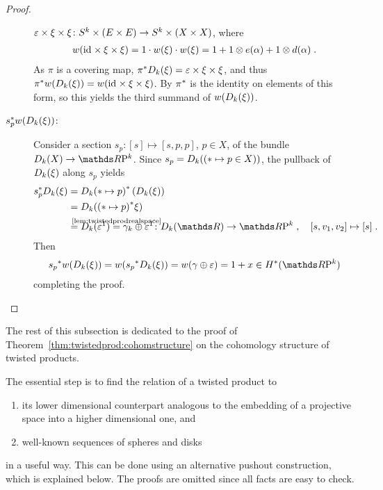 \begin{Cor}
\begin{proof}
\begin{description}
      $\varepsilon\times\xi\times\xi\colon
      S^{k}\times(E\times E)\to S^{k}\times(X\times X)$, where
      \begin{gather*}
        {w}(\mathrm{id}_{}\times\xi\times\xi)
        = 1\cdot {w}(\xi)\cdot{w}(\xi)
        = 1 + 1\otimes e(\alpha) + 1\otimes d(\alpha)
        \;.
      \end{gather*}
      As $\pi$ is a covering map,
      ${\pi}^*D_{k}({\xi})=\varepsilon\times\xi\times\xi$,
      and thus
      ${\pi}^*{w}(D_{k}({\xi}))={w}(\mathrm{id}_{}\times\xi\times\xi)$.
      By  ${\pi}^*$ is the identity on
      elements of this form, so this yields the third
      summand of ${w}(D_{k}({\xi}))$.
    \item[${s}^*_p {w}(D_{k}({\xi}))$:]
      Consider a section $s_p\colon [s]\mapsto [s,p,p]$, $p\in X$, of
      the bundle $\Twistedprod k X\to\RP k$. Since
      $s_p=D_{k}({(\ast\mapsto p\in X)})$,
      the pullback of $D_{k}({\xi})$ along $s_p$ yields
      \begin{align*}
        \pb s_p\Twistedprod{k}{\xi}
        &= \pb{\Twistedprod{k}{\ast\mapsto p}}
          \left(\Twistedprod{k}{\xi}\right) \\
        &= \Twistedprod{k}{\pb{(\ast\mapsto p)}\xi} \\
        &= \Twistedprod{k}{\trivbdl^1}
        \cequalsby{\ref{lem:twistedprodrealspace}}
          \gamma_k\oplus\trivbdl^1
          \colon
          \Twistedprod{k}{\R} \to \RP k\;,\quad
          [s, v_1,v_2] \mapsto [s]
          \;.
      \end{align*}
      Then
      \begin{gather*}
        \pb{s_p}\W{\Twistedprod{k}{\xi}}
        = \W{\pb{s_p}\Twistedprod{k}{\xi}}
        = \W{\gamma\oplus\trivbdl}
        = 1+x\in\H^*(\RP k)
      \end{gather*}
      completing the proof.
      \qedhere
    \end{description}
  \end{proof}
\end{Cor}

The rest of this subsection is dedicated to the proof of
Theorem~\ref{thm:twistedprod:cohomstructure} on the cohomology
structure of twisted products.

The essential step is to find the relation of a twisted product to
\begin{enumerate}[1.]
\item its lower dimensional counterpart analogous to the embedding of
  a projective space into a higher dimensional one, and
\item well-known sequences of spheres and disks
\end{enumerate}
in a useful way.
This can be done using an alternative pushout construction, which is
explained below. The proofs are omitted since all facts are easy to
check.


